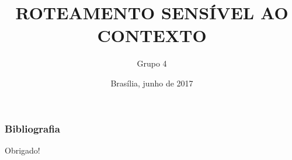 \documentclass{beamer}
\title[IoT]{ROTEAMENTO SENSÍVEL AO CONTEXTO} %
\author{Grupo 4} %
\institute[UnB] %
{
Universidade de Brasília \\ %
\medskip
\textit{} %
}
\date{Brasília, junho  de 2017} %
\begin{document}


\begin{frame}[t, allowframebreaks]
\frametitle{Bibliografia}
{\tiny
  }
  \nocite{*}  %
\end{frame}

\begin{frame}
	\begin{center}
		{\Huge Obrigado!}
	\end{center}
\end{frame}
\end{document}

